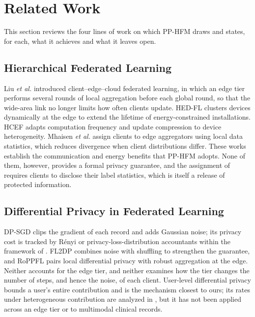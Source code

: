 \section{Related Work}
\label{sec:related}

This section reviews the four lines of work on which PP-HFM draws and states,
for each, what it achieves and what it leaves open.

\subsection{Hierarchical Federated Learning}
Liu \emph{et al.} \cite{ref2} introduced client--edge--cloud federated
learning, in which an edge tier performs several rounds of local aggregation
before each global round, so that the wide-area link no longer limits how
often clients update. HED-FL \cite{ref3} clusters devices dynamically at the
edge to extend the lifetime of energy-constrained installations. HCEF
\cite{ref4} adapts computation frequency and update compression to device
heterogeneity. Mhaisen \emph{et al.} \cite{ref5} assign clients to edge
aggregators using local data statistics, which reduces divergence when client
distributions differ. These works establish the communication and energy
benefits that PP-HFM adopts. None of them, however, provides a formal privacy
guarantee, and the assignment of \cite{ref5} requires clients to disclose
their label statistics, which is itself a release of protected information.

\subsection{Differential Privacy in Federated Learning}
DP-SGD \cite{ref6} clips the gradient of each record and adds Gaussian noise;
its privacy cost is tracked by R\'enyi \cite{ref7, ref29} or
privacy-loss-distribution \cite{ref33} accountants within the framework of
\cite{ref8}. FL2DP \cite{ref9} combines noise with shuffling to strengthen
the guarantee, and RoPPFL \cite{ref10} pairs local differential privacy with
robust aggregation at the edge. Neither accounts for the edge tier, and
neither examines how the tier changes the number of steps, and hence the
noise, of each client. User-level differential privacy \cite{ref11} bounds a
user's entire contribution and is the mechanism closest to ours; its rates
under heterogeneous contribution are analyzed in \cite{ref32}, but it has not
been applied across an edge tier or to multimodal clinical records.

